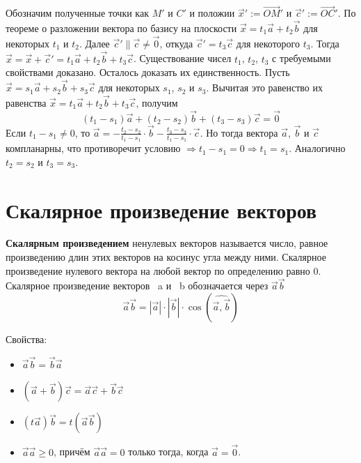 \documentclass[a4paper]{article}
\begin{document}
Обозначим полученные точки как $M'$ и $C'$ и положии $\vec{x}' := \overrightarrow{OM}'$ и $\vec{c}' := \overrightarrow{OC}'$. По теореме о разложении вектора по базису на плоскости  $\vec{x} = t_1 \vec{a} + t_2 \vec{b}$ для некоторых $t_1$ и $t_2$. Далее $\vec{c}' \parallel \vec{c} \neq \vec{0}$, откуда $\vec{c}' = t_3 \vec{c}$ для некоторого $t_3$. Тогда $\vec{x} = \vec{x} + \vec{c}' = t_1 \vec{a} + t_2 \vec{b} + t_3 \vec{c}$. Существование чисел $t_1$, $t_2$, $t_3$ с требуемыми свойствами доказано.
Осталось доказать их единственность. Пусть $\vec{x} = s_1 \vec{a} + s_2 \vec{b} + s_3 \vec{c}$ для некоторых $s_1$, $s_2$ и $s_3$. Вычитая это равенство их равенства $\vec{x} = t_1 \vec{a} + t_2 \vec{b} + t_3 \vec{c}$, получим  
\begin{equation}
(t_1 -s_1) \vec{a} + (t_2 - s_2)\vec{b} + (t_3 - s_3) \vec{c} = \vec{0}
\end{equation}
Если $\displaystyle t_1 -s_1 \neq	0$, то $\vec{a} = - \frac{t_2 - s_2}{t_1 - s_1} \cdot \vec{b} - \frac{t_3 - s_3}{t_1 - s_1} \cdot \vec{c}$. Но тогда вектора $\vec{a}$, $\vec{b}$ и $\vec{c}$ компланарны, что противоречит условию $\Rightarrow t_1 - s_1 = 0 \Rightarrow t_1 = s_1$. Аналогично $t_2 = s_2$ и $t_3 = s_3$.


\section*{Скалярное произведение векторов}

\textbf{Скалярным произведением} ненулевых векторов называется число, равное
произведению длин этих векторов на косинус угла между ними. Скалярное
произведение нулевого вектора на любой вектор по определению равно 0.
Скалярное произведение векторов ~a и ~b обозначается через $\vec{a} \vec{b}$
\begin{equation}
\vec{a} \vec{b} = |\vec{a}| \cdot | \vec{b} | \cdot \cos(\widehat{\vec{a}, \vec{b}})
\end{equation}

Свойства:
\begin{itemize}
\item $\vec{a} \vec{b} = \vec{b} \vec{a}$
\item $(\vec{a} + \vec{b}) \vec{c} = \vec{a} \vec{c} + \vec{b} \vec{c}$
\item $(t \vec{a}) \vec{b} = t (\vec{a} \vec{b})$
\item $\vec{a} \vec{a} \geq 0$, причём $\vec{a} \vec{a} = 0$ только тогда, когда $\vec{a} = \vec{0}$.
\end{itemize}
\end{document}
